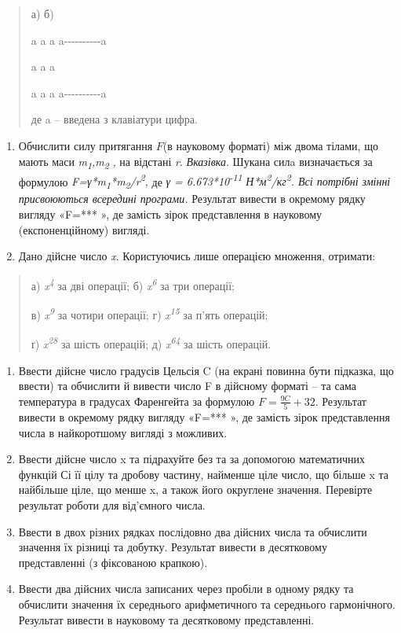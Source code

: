 \documentclass[]{article}
\begin{document}
\begin{quote}
а) б)

a a a a-\/-\/-\/-\/-\/-\/-\/-\/-\/-a

a a \textbar{} a \textbar{}

a a a a-\/-\/-\/-\/-\/-\/-\/-\/-\/-a

де a -- введена з клавіатури цифра.
\end{quote}

\begin{enumerate}
\def\labelenumi{\arabic{enumi}.}
\item
  Обчислити силу притягання \(F\)(в науковому форматі) між двома тілами,
  що мають маси \emph{m\textsubscript{1},m\textsubscript{2}} \emph{,} на
  відстані \emph{r}. \emph{\emph{Вказівка}}. Шукана силa визначається за
  формулою
  \emph{F=γ*m\textsubscript{1}*m\textsubscript{2}/r\textsuperscript{2},}
  де \emph{γ = 6.673*10\textsuperscript{-11}
  Н*м\textsuperscript{2}/кг\textsuperscript{2}. Всі потрібні змінні
  присвоюються всередині програми.} Результат вивести в окремому рядку
  вигляду «F=*** », де замість зірок представлення в науковому
  (експоненційному) вигляді.
\item
  Дано дійсне число \emph{x}. Користуючись лише операцією множення,
  отримати:
\end{enumerate}

\begin{quote}
а) \emph{x\textsuperscript{4}} за дві операції; б)
\emph{x\textsuperscript{6}} за три операції;

в) \emph{x\textsuperscript{9}} за чотири операції; г)
\emph{x\textsuperscript{15}} за п'ять операцій;

ґ) \emph{x\textsuperscript{28}} за шість операцій; д)
\emph{x\textsuperscript{64}} за шість операцій.
\end{quote}

\begin{enumerate}
\def\labelenumi{\arabic{enumi}.}
\item
  Ввести дійсне число градусів Цельсія C (на екрані повинна бути
  підказка, що ввести) та обчислити й вивести число F в дійсному форматі
  -- та сама температура в градусах Фаренгейта за формулою
  \(F = \frac{9C}{5} + 32\). Результат вивести в окремому рядку вигляду
  «F=*** », де замість зірок представлення числа в найкоротшому вигляді
  з можливих.
\item
  Ввести дійсне число x та підрахуйте без та за допомогою математичних
  функцій Сі її цілу та дробову частину, найменше ціле число, що більше
  x та найбільше ціле, що менше x, а також його округлене значення.
  Перевірте результат роботи для від'ємного числа.
\item
  Ввести в двох різних рядках послідовно два дійсних числа та обчислити
  значення їх різниці та добутку. Результат вивести в десятковому
  представленні (з фіксованою крапкою).
\item
  Ввести два дійсних числа записаних через пробіли в одному рядку та
  обчислити значення їх середнього арифметичного та середнього
  гармонічного. Результат вивести в науковому та десятковому
  представленні.
\end{enumerate}
\end{document}
